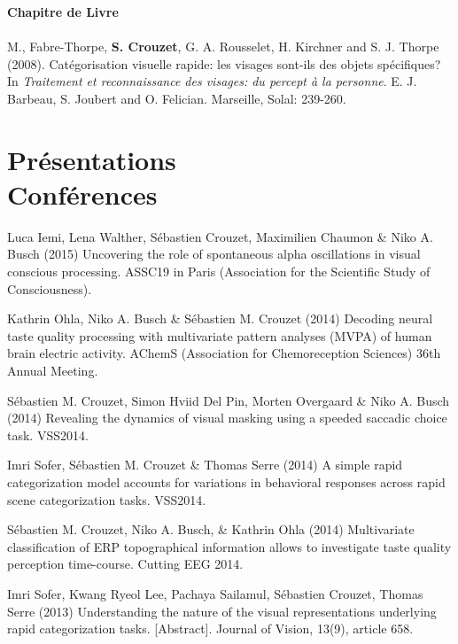 \documentclass[margin,line]{resume}
\begin{document}
\begin{resume}
\vspace{3mm}	
\textbf{Chapitre de Livre}\\\\
	M., Fabre-Thorpe, \textbf{S. Crouzet}, G. A. Rousselet, H. Kirchner and S. J. Thorpe (2008). Catégorisation visuelle rapide: les visages sont-ils des 	objets spécifiques? In \textsl{Traitement et reconnaissance des visages: du percept à la personne}. E. J. Barbeau, S. Joubert and O. Felician. Marseille, Solal: 239-260.


\vspace{3mm}	
    \section{\mysidestyle Présentations\\Conférences}

	\footnotesize %
	
	Luca Iemi, Lena Walther, Sébastien Crouzet, Maximilien Chaumon \& Niko A. Busch (2015) Uncovering the role of spontaneous alpha oscillations in visual conscious processing. ASSC19 in Paris (Association for the Scientific Study of Consciousness).
	
	\vspace{-2mm} Kathrin Ohla, Niko A. Busch \& Sébastien M. Crouzet (2014) Decoding neural taste quality processing with multivariate pattern analyses (MVPA) of human brain electric activity. AChemS (Association for Chemoreception Sciences) 36th Annual Meeting.

	\vspace{-2mm} Sébastien M. Crouzet, Simon Hviid Del Pin, Morten Overgaard \& Niko A. Busch (2014) Revealing the dynamics of visual masking using a speeded saccadic choice task. VSS2014.

	\vspace{-2mm} Imri Sofer, Sébastien M. Crouzet \& Thomas Serre (2014) A simple rapid categorization model accounts for variations in behavioral responses across rapid scene categorization tasks. VSS2014.

	\vspace{-2mm} Sébastien M. Crouzet, Niko A. Busch, \& Kathrin Ohla (2014) Multivariate classification of ERP topographical information allows to investigate taste quality perception time-course. Cutting EEG 2014.
	
	\vspace{-2mm} Imri Sofer, Kwang Ryeol Lee, Pachaya Sailamul, Sébastien Crouzet, Thomas Serre (2013) Understanding the nature of the visual representations underlying rapid categorization tasks. [Abstract]. Journal of Vision, 13(9), article 658.
	

\end{resume}
\end{document}
